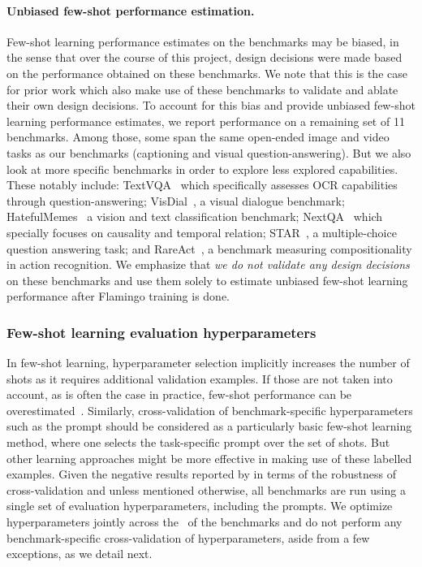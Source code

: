 \paragraph{Unbiased few-shot performance estimation.} 
Few-shot learning performance estimates on the \dev{} benchmarks may be biased, in the sense that over the course of this project, design decisions were made based on the performance obtained on these benchmarks.
We note that this is the case for prior work which also make use of these benchmarks to validate and ablate their own design decisions.
To account for this bias and provide unbiased few-shot learning performance estimates, we report performance on a remaining set of 11 benchmarks.
Among those, some span the same open-ended image and video tasks as our \dev{} benchmarks (captioning and visual question-answering).
But we also look at more specific benchmarks in order to explore less explored capabilities. 
These notably include:
TextVQA~\citep{singh2019towards} which specifically assesses OCR capabilities through question-answering;
VisDial~\citep{das2017visual}, a visual dialogue benchmark;
HatefulMemes~\citep{kiela2020hateful} a vision and text classification benchmark;
NextQA~\citep{xiao2021next} which specially focuses on causality and temporal relation;
STAR~\citep{wu2021star}, a multiple-choice question answering task;
and RareAct~\citep{miech20rareact}, a benchmark measuring compositionality in action recognition.
We emphasize that \emph{we do not validate any design decisions} on these benchmarks and use them solely to estimate unbiased few-shot learning performance after Flamingo training is done.



\subsubsection{Few-shot learning evaluation hyperparameters} 
\label{app:fewshot-eval-hyper}

In few-shot learning, hyperparameter selection implicitly increases the number of shots as it requires additional validation examples.
If those are not taken into account, as is often the case in practice, few-shot performance can be overestimated~\citep{truefewshot}.
Similarly, cross-validation of benchmark-specific hyperparameters such as the prompt should be considered as a particularly basic few-shot learning method, where one selects the task-specific prompt over the set of shots.
But other learning approaches might be more effective in making use of these labelled examples.
Given the negative results reported by \cite{truefewshot} in terms of the robustness of cross-validation and unless mentioned otherwise, all benchmarks are run using a single set of evaluation hyperparameters, including the prompts. 
We optimize hyperparameters jointly across the \metadevsubsets~of the \dev{} benchmarks and do not perform any benchmark-specific cross-validation of hyperparameters, aside from a few exceptions, as we detail next.

